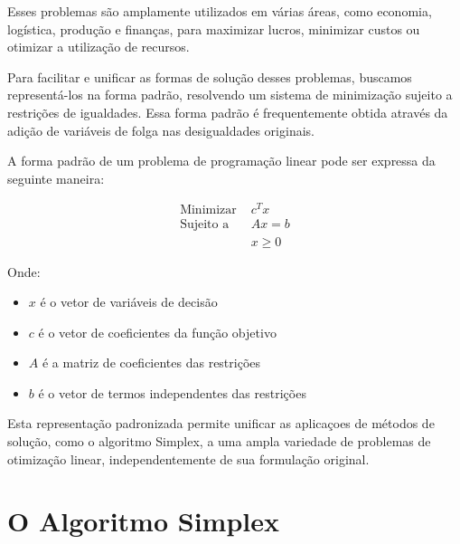 \documentclass{article}
\begin{document}
Esses problemas são amplamente utilizados em várias áreas, como economia, logística, produção e finanças, para maximizar lucros, minimizar custos ou otimizar a utilização de recursos.


Para facilitar e unificar as formas de solução desses problemas, buscamos representá-los na forma padrão, resolvendo um sistema de minimização sujeito a restrições de igualdades. Essa forma padrão é frequentemente obtida através da adição de variáveis de folga nas desigualdades originais.

A forma padrão de um problema de programação linear pode ser expressa da seguinte maneira:

\begin{align*}
\text{Minimizar } & c^T x \\
\text{Sujeito a } & Ax = b \\
& x \geq 0
\end{align*}

Onde:
\begin{itemize}
    \item $x$ é o vetor de variáveis de decisão
    \item $c$ é o vetor de coeficientes da função objetivo
    \item $A$ é a matriz de coeficientes das restrições
    \item $b$ é o vetor de termos independentes das restrições
\end{itemize}

Esta representação padronizada permite unificar as aplicaçoes de métodos de solução, como o algoritmo Simplex, a uma ampla variedade de problemas de otimização linear, independentemente de sua formulação original.



\section{O Algoritmo Simplex}
\end{document}
